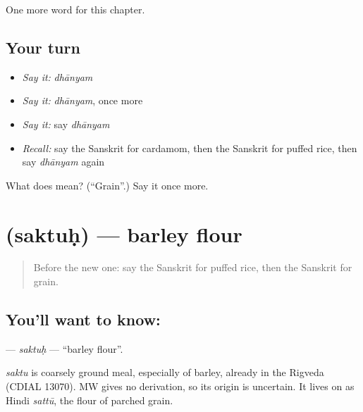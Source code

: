 \begin{grammarlens}[title={What you've built}]
One more word for this chapter.
\end{grammarlens}

\subsection*{Your turn}
\begin{itemize}
\raggedright
  \item \emph{Say it:} \emph{dhānyam}
  \item \emph{Say it:} \emph{dhānyam}, once more
  \item \emph{Say it:} say \emph{dhānyam}
  \item \emph{Recall:} say the Sanskrit for cardamom, then the Sanskrit for puffed rice, then say \emph{dhānyam} again
\end{itemize}

\begin{tcolorbox}[breakable,colback=teal!4,colframe=teal!35!black,title={Before you move on}]
What does  mean? (\textquotedblleft{}Grain\textquotedblright{}.) Say it once more.
\end{tcolorbox}
\section[\texorpdfstring{\sk{सक्तुः} (saktuḥ)}{सक्तुः (saktuḥ)}]{ (saktuḥ) — barley flour}

\label{lesson:SA-C246-saktuh}



\begin{quote}
Before the new one: say the Sanskrit for puffed rice, then the Sanskrit for grain.
\end{quote}

\subsection*{You'll want to know: }
\textbf{} — \emph{saktuḥ} — \textquotedblleft{}barley flour\textquotedblright{}.

\begin{cousinweb}
\emph{saktu} is coarsely ground meal, especially of barley, already in the Rigveda (CDIAL 13070). MW gives no derivation, so its origin is uncertain. It lives on as Hindi \emph{sattū}, the flour of parched grain.
\end{cousinweb}

